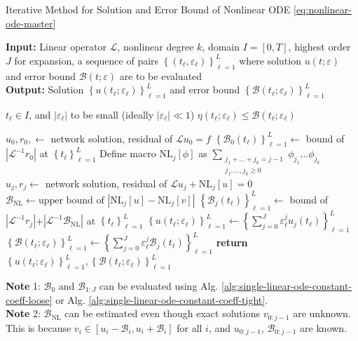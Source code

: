 \documentclass[accepted]{uai2023}
\newcommand{\Err}{\eta}
\newcommand{\Bound}{\mathcal{B}}
\renewcommand{\L}{\mathcal{L}}
\begin{document}
    \begin{algorithm}
        \small
        \caption{Iterative Method for Solution and Error Bound of Nonlinear ODE \ref{eq:nonlinear-ode-master}} \label{alg:nonlinear-iterative}
        \textbf{Input:} Linear operator $\L$, nonlinear degree $k$, domain $I=[0, T]$, highest order $J$ for expansion, a sequence of pairs $\left\{(t_\ell, \varepsilon_\ell)\right\}_{\ell=1}^{L}$ where solution $u(t; \varepsilon)$ and error bound $\Bound(t; \varepsilon)$ are to be evaluated \\
        \textbf{Output:} Solution $\left\{u(t_\ell; \varepsilon_\ell)\right\}_{\ell=1}^{L}$ and error bound $\left\{\Bound(t_\ell; \varepsilon_\ell)\right\}_{\ell=1}^{L}$ 
        \begin{algorithmic}
            \Require $t_\ell \in I$, and $|\varepsilon_\ell|$ to be small (ideally $|\varepsilon_\ell| \ll 1$)
            \Ensure $\Err(t_\ell; \varepsilon_\ell) \leq \Bound(t_\ell; \varepsilon_\ell)$ 

            \State $u_0, r_0, \gets$ network solution, residual of $\L u_0 = f$
            \State $\left\{\Bound_{0}(t_\ell)\right\}_{\ell=1}^L \gets$ bound of $\left|\L^{-1}r_0\right|$ at $\left\{t_\ell\right\}_{\ell=1}^L$
                \State Define macro $\text{NL}_j[\phi]$ as $\sum_{\substack{j_1 + \dots + j_k = j-1\\ j_1, \dots, j_k \geq 0}} \phi_{j_1} \dots \phi_{j_k}$
                \State $u_j, r_j \gets$ network solution, residual of $\L u_j + \text{NL}_j[u] = 0$
                \State $\Bound_{\text{NL}} \gets \text{upper bound of }|\text{NL}_j[u] - \text{NL}_j[v]|$
                \State $\left\{\Bound_{j}(t_\ell)\right\}_{\ell=1}^L \gets$  bound of $|\L^{-1}r_j|$+$|\L^{-1}\Bound_{\text{NL}}|$ at $\left\{t_\ell\right\}_{\ell=1}^L$
            \EndFor
            \State $\left\{u(t_\ell; \varepsilon_\ell)\right\}_{\ell=1}^L \gets \left\{\sum_{j=0}^{J}\varepsilon_\ell^j u_j(t_\ell)\right\}_{\ell=1}^L $ 
            \State $\left\{\Bound(t_\ell; \varepsilon_\ell)\right\}_{\ell=1}^L \gets \left\{\sum_{j=0}^{J}\varepsilon_\ell^j \Bound_j(t_\ell)\right\}_{\ell=1}^L $ 
            \State \textbf{return} $\left\{u(t_\ell; \varepsilon_\ell)\right\}_{\ell=1}^L, \left\{\Bound(t_\ell; \varepsilon_\ell)\right\}_{\ell=1}^L$
        \end{algorithmic}
        \vspace{0.5em}

        \textbf{Note} 1: $\Bound_0$ and $\Bound_{1:J}$ can be evaluated using Alg. \ref{alg:single-linear-ode-constant-coeff-loose} or Alg. \ref{alg:single-linear-ode-constant-coeff-tight}.\\
        \textbf{Note} 2: $\Bound_\text{NL}$ can be estimated even though exact solutions $v_{0:j-1}$ are unknown. This is because $v_i \in [u_i - \Bound_i, u_i+\Bound_i]$ for all $i$, and $u_{0:j-1}$, $\Bound_{0:j-1}$ are known.
    \end{algorithm}
\end{document}
